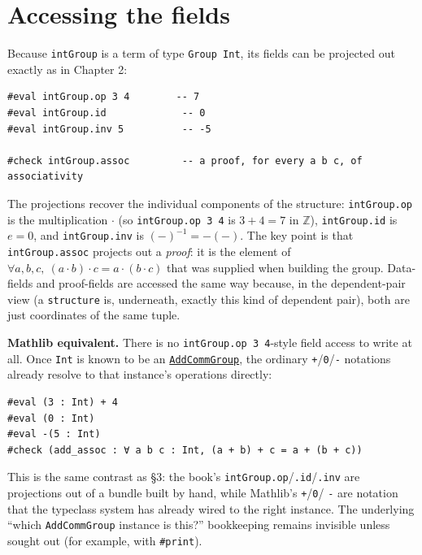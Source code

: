 \section{Accessing the fields}\label{sec:06-groups:05-accessing-fields:1}

Because \texttt{intGroup} is a term of type \texttt{Group Int}, its fields can be projected out exactly as in Chapter 2:

\begin{lstlisting}
#eval intGroup.op 3 4        -- 7
#eval intGroup.id             -- 0
#eval intGroup.inv 5          -- -5

#check intGroup.assoc         -- a proof, for every a b c, of associativity
\end{lstlisting}

\begin{mathreading}

The projections recover the individual components of the structure: \texttt{intGroup.op} is the multiplication \(\cdot\) (so \texttt{intGroup.op 3 4} is \(3 + 4 = 7\) in \(\mathbb{Z}\)), \texttt{intGroup.id} is \(e = 0\), and \texttt{intGroup.inv} is \((-)^{-1} = -(-)\). The key point is that \texttt{intGroup.assoc} projects out a \emph{proof}: it is the element of \(\forall
a,b,c,\ (a\cdot b)\cdot c = a\cdot(b\cdot c)\) that was supplied when building the group. Data-fields and proof-fields are accessed the same way because, in the dependent-pair view (a \texttt{structure} is, underneath, exactly this kind of dependent pair), both are just coordinates of the same tuple.

\end{mathreading}

\textbf{Mathlib equivalent.} There is no \texttt{intGroup.op 3 4}-style field access to write at all. Once \texttt{Int} is known to be an \href{https://loogle.lean-lang.org/?q=AddCommGroup}{\texttt{AddCommGroup}}, the ordinary \texttt{+}/\texttt{0}/\texttt{-\allowbreak{}} notations already resolve to that instance's operations directly:

\begin{lstlisting}
#eval (3 : Int) + 4
#eval (0 : Int)
#eval -(5 : Int)
#check (add_assoc : ∀ a b c : Int, (a + b) + c = a + (b + c))
\end{lstlisting}

This is the same contrast as §3: the book's \texttt{intGroup.op}/\texttt{.id}/\texttt{.inv} are projections out of a bundle built by hand, while Mathlib's \texttt{+}/\texttt{0}/ \texttt{-\allowbreak{}} are notation that the typeclass system has already wired to the right instance. The underlying ``which \texttt{AddCommGroup} instance is this?'' bookkeeping remains invisible unless sought out (for example, with \texttt{\#print}).
